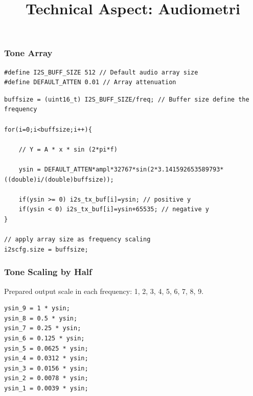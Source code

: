 \documentclass[table,dvipsnames]{beamer}
\title[Audiometri]{Technical Aspect: Audiometri}
\author{}
\institute[VibrasticLab : \ccbysa]{
	Achmadi ST MT
}
\date{}
\begin{document}
	
	\begin{frame}
		\titlepage
	\end{frame}

	\begin{frame}[fragile]
		\frametitle{Tone Array}
		
		\begin{exampleblock}{}
			\begin{verbatim}
#define I2S_BUFF_SIZE 512 // Default audio array size
#define DEFAULT_ATTEN 0.01 // Array attenuation
			\end{verbatim}
		\end{exampleblock}
		
		\begin{exampleblock}{}
			\begin{verbatim}
buffsize = (uint16_t) I2S_BUFF_SIZE/freq; // Buffer size define the frequency

for(i=0;i<buffsize;i++){
	
	// Y = A * x * sin (2*pi*f)

	ysin = DEFAULT_ATTEN*ampl*32767*sin(2*3.141592653589793*((double)i/(double)buffsize));
	
	if(ysin >= 0) i2s_tx_buf[i]=ysin; // positive y
	if(ysin < 0) i2s_tx_buf[i]=ysin+65535; // negative y
}

// apply array size as frequency scaling
i2scfg.size = buffsize;
			\end{verbatim}
		\end{exampleblock}
	
	\end{frame}

	\begin{frame}[fragile]
		\frametitle{Tone Scaling by Half}
		
		\begin{exampleblock}{}
			Prepared output scale in each frequency: 1, 2, 3, 4, 5, 6, 7, 8, 9.
		\end{exampleblock}
		
		\begin{exampleblock}{}
			\begin{verbatim}
ysin_9 = 1 * ysin;
ysin_8 = 0.5 * ysin;
ysin_7 = 0.25 * ysin;
ysin_6 = 0.125 * ysin;
ysin_5 = 0.0625 * ysin;
ysin_4 = 0.0312 * ysin;
ysin_3 = 0.0156 * ysin;
ysin_2 = 0.0078 * ysin;
ysin_1 = 0.0039 * ysin;
			\end{verbatim}
		\end{exampleblock}
	\end{frame}
\end{document}
